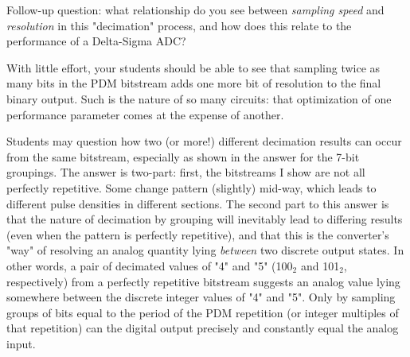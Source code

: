 \vskip 10pt

Follow-up question: what relationship do you see between {\it sampling speed} and {\it resolution} in this "decimation" process, and how does this relate to the performance of a Delta-Sigma ADC?







With little effort, your students should be able to see that sampling twice as many bits in the PDM bitstream adds one more bit of resolution to the final binary output.  Such is the nature of so many circuits: that optimization of one performance parameter comes at the expense of another.

Students may question how two (or more!) different decimation results can occur from the same bitstream, especially as shown in the answer for the 7-bit groupings.  The answer is two-part: first, the bitstreams I show are not all perfectly repetitive.  Some change pattern (slightly) mid-way, which leads to different pulse densities in different sections.  The second part to this answer is that the nature of decimation by grouping will inevitably lead to differing results (even when the pattern is perfectly repetitive), and that this is the converter's "way" of resolving an analog quantity lying {\it between} two discrete output states.  In other words, a pair of decimated values of "4" and "5" (100$_{2}$ and 101$_{2}$, respectively) from a perfectly repetitive bitstream suggests an analog value lying somewhere between the discrete integer values of "4" and "5".  Only by sampling groups of bits equal to the period of the PDM repetition (or integer multiples of that repetition) can the digital output precisely and constantly equal the analog input.




